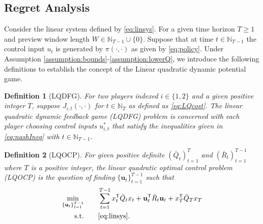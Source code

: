\documentclass[letterpaper, 10 pt, conference]{ieeeconf}  %
\newcommand{\transpose}{\mathsf{T}}
\newtheorem{definition}{Definition}
\begin{document}
\subsection{Regret Analysis}
Consider the linear system defined by \eqref{eq:linsys}. For a given time horizon $T \geq 1$ and preview window length $W\in \mathbb{N}_{T-1} \cup \{0\}$. Suppose that at time $t \in \mathbb{N}_{T-1}$ the control input $u_{t}$ is generated by $\pi(\cdot,\cdot)$ as given by \eqref{eq:policy}. Under Assumption \ref{assumption:bounds}-\ref{assumption:lowerQ}, we introduce the following definitions to establish the concept of the Linear quadratic dynamic potential game.
\begin{definition}[LQDFG]\label{def:LQDFG}
     For two players indexed $i\in\{1,2\}$ and a given positive integer $T$, suppose $J_{i,t}(\cdot,\cdot)$ for $t\in\mathbb{N}_{T}$ as defined as \eqref{eq:LQcost}. The linear quadratic dynamic feedback game (LQDFG) problem is concerned with each player choosing control inputs $u_{i,t}^{*}$ that satisfy the inequalities given in \eqref{eq:nashIneq} with $t \in \mathbb{N}_{T-1}$. 
\end{definition}
\begin{definition}[LQOCP]\label{def:LQOCP}
    For given positive definite $(\bar{Q}_{t})_{t=1}^{T}$ and $(\bar{R}_{t})_{t=1}^{T-1}$ where $T$ is a positive integer, the linear quadratic optimal control problem (LQOCP) is the question of finding $\{\mathbf{u}_{t}\}_{t=1}^{T-1}$ such that
    \begin{equation}\label{eq:LQOCP}
\begin{split}
    \min_{\{\mathbf{u}_{t}\}_{t=1}^{T-1}}\qquad & \sum_{t=1}^{T-1} x_{t}^{\transpose}\bar{Q}_{t}x_{t} + \mathbf{u}_{t}^{\transpose}\bar{R}_{t}\mathbf{u}_{t} + x_{T}^{\transpose}\bar{Q}_{T}x_{T}\\
    \text{s.t.} \qquad &  \eqref{eq:linsys}.
\end{split}
\end{equation}
\end{definition}
\end{document}
